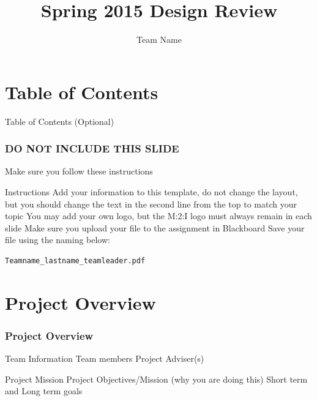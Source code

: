 \documentclass[11pt]{beamer}
\title{Spring 2015 Design Review}
\subtitle{Team Name}
\institute{Make to Innovate\ \\ Iowa State University}
\begin{document}
\begin{frame}
\titlepage
\end{frame}

\section{Table of Contents}
\begin{frame}
Table of Contents (Optional)
\tableofcontents
\end{frame}

\begin{frame}[fragile]
\frametitle{DO NOT INCLUDE THIS SLIDE}
Make sure you follow these instructions

\begin{block}{Instructions}
Add your information to this template, do not change the layout, but you should change the text in the second line from the top to match your topic
You may add your own logo, but the M:2:I logo must always remain in each slide
Make sure you upload your file to the assignment in Blackboard
Save your file using the naming below:

\end{block}
\begin{verbatim}
Teamname_lastname_teamleader.pdf
\end{verbatim}
\end{frame}

\section{Project Overview}
\begin{frame}
\frametitle{Project Overview}

\begin{block}{Team Information}
Team members
Project Adviser(s)

\end{block}

\begin{block}{Project Mission}
Project Objectives/Mission (why you are doing this)
Short term and Long term goals
\end{block}

\end{frame}
\end{document}
